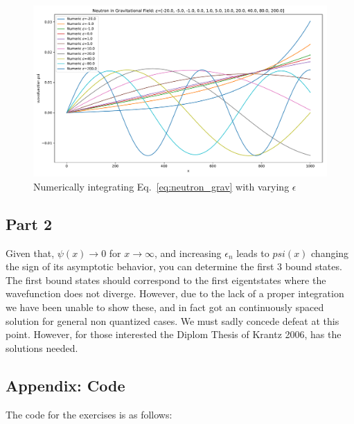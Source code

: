 \documentclass[12pt,a4paper,twoside]{article}
\begin{document}
\begin{figure}[h!]
  \centering
  \includegraphics[width=.9\textwidth]{../exercise4_problem2_varyEps.pdf}
  \caption{Numerically integrating Eq.~\ref{eq:neutron_grav} with varying $\epsilon$}
  \label{fig:2b}
\end{figure}



\subsection*{Part 2}

Given that, $\psi(x) \rightarrow 0$ for $x \rightarrow \infty$, 
and increasing $\epsilon_n$ leads to $psi(x)$ changing the sign of its asymptotic
behavior, you can determine the first 3 bound states. The first bound states should correspond
to the first eigentstates where the wavefunction does not diverge. However, due to the lack of a 
proper integration we have been unable to show these, and in fact got an continuously spaced
solution for general non quantized cases. We must sadly concede defeat at this point. However, for those interested the Diplom Thesis of Krantz 2006, has the solutions needed. 



%
\subsection*{Appendix: Code}
The code for the exercises is as follows:

\end{document}
